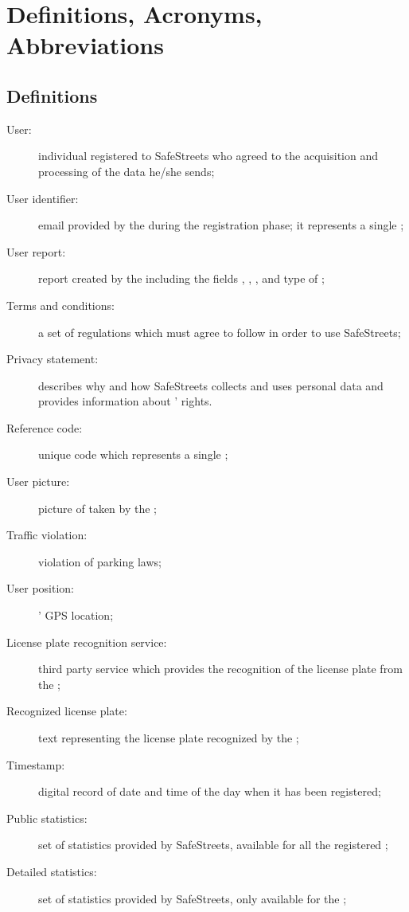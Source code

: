 \documentclass[../../RASD.tex]{subfiles}
\begin{document}
\section{Definitions, Acronyms, Abbreviations\label{sect:1.3}}

\subsection{Definitions\label{sect:1.3.1}}
\begin{description}
	\item[User:] individual registered to SafeStreets who agreed to the acquisition and processing of the data he/she sends;
	\item[User identifier:] email provided by the  during the registration phase; it represents a single ;
	\item[User report:] report created by the  including the fields , , ,  and type of ;
	\item[Terms and conditions:] a set of regulations which  must agree to follow	in order to use SafeStreets;
	\item[Privacy statement:] describes why and how SafeStreets collects and uses personal data and provides information about ' rights.
	\item[Reference code:] unique code which represents a single ;
	\item[User picture:] picture of  taken by the ;
	\item[Traffic violation:] violation of parking laws;
	\item[User position:] ' GPS location;
	\item[License plate recognition service:] third party service which provides the recognition of the license plate from the ;
	\item[Recognized license plate:] text representing the license plate recognized by the ;
	\item[Timestamp:] digital record of date and time of the day when it has been registered;
	\item[Public statistics:] set of  statistics provided by SafeStreets, available for all the registered ;
	\item[Detailed statistics:] set of  statistics provided by SafeStreets, only available for the ;

\end{description}
\end{document}
